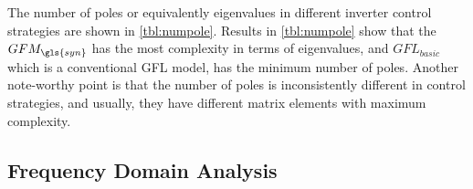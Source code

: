 





The number of poles or equivalently eigenvalues in different inverter control strategies are shown in \ref{tbl:numpole}. Results in \ref{tbl:numpole} show that the $GFM_{\gls{syn}}$ has the most complexity in terms of eigenvalues, and $GFL_{basic}$ which is a conventional GFL model, has the minimum number of poles. Another note-worthy point is that the number of poles is inconsistently different in control strategies, and usually, they have different matrix elements with maximum complexity. 


\subsection{Frequency Domain Analysis}

